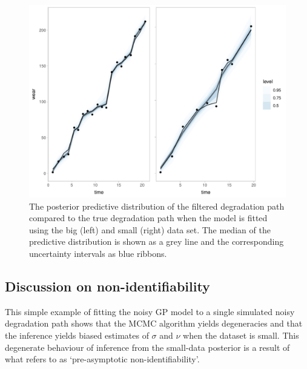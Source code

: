 \documentclass{article}
\begin{document}
\begin{figure}
    \centering
    \includegraphics[width=0.8\columnwidth]{../figures/ppd_z_a.pdf}
    \caption{The posterior predictive distribution of the filtered degradation path compared to the true degradation path when the model is fitted using the big (left) and small (right) data set. The median of the predictive distribution is shown as a grey line and the corresponding uncertainty intervals as blue ribbons.}
    \label{fig:ppd-filtered-degradation}
\end{figure}

\subsection{Discussion on non-identifiability}

This simple example of fitting the noisy GP model to a single simulated noisy degradation path shows that the MCMC algorithm yields degeneracies and that the inference yields biased estimates of $\sigma$ and $\nu$ when the dataset is small. This degenerate behaviour of inference from the small-data posterior is a result of what \citet{betancourt_2020} refers to as `pre-asymptotic non-identifiability'.
\end{document}
